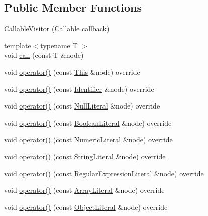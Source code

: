 \subsection*{Public Member Functions}
\begin{DoxyCompactItemize}
\item 
\hyperlink{struct_callable_visitor_af9bd3a4132494b0c91dc4f7b46e5dd0e}{Callable\+Visitor} (Callable \hyperlink{struct_callable_visitor_a52ce52c399eb34a2a16abec3361e48b8}{callback})
\item 
{\footnotesize template$<$typename T $>$ }\\void \hyperlink{struct_callable_visitor_a4ce6de39a481c39fd7eda7a317bef28a}{call} (const T \&node)
\item 
void \hyperlink{struct_callable_visitor_ac435fdf6fcab885cf21f27364883c8ad}{operator()} (const \hyperlink{struct_this}{This} \&node) override
\item 
void \hyperlink{struct_callable_visitor_a83e70f05edc12de1717db28d2cd11cd5}{operator()} (const \hyperlink{struct_identifier}{Identifier} \&node) override
\item 
void \hyperlink{struct_callable_visitor_a5bce06c30e25d3a5498bc699f6e61ecc}{operator()} (const \hyperlink{struct_null_literal}{Null\+Literal} \&node) override
\item 
void \hyperlink{struct_callable_visitor_a76ea62da5cc85a9e301f68bb61d225c7}{operator()} (const \hyperlink{struct_boolean_literal}{Boolean\+Literal} \&node) override
\item 
void \hyperlink{struct_callable_visitor_a88418c625d814fd301125a640392fead}{operator()} (const \hyperlink{struct_numeric_literal}{Numeric\+Literal} \&node) override
\item 
void \hyperlink{struct_callable_visitor_a9746653850696a2060b0c2eeff8eaa69}{operator()} (const \hyperlink{struct_string_literal}{String\+Literal} \&node) override
\item 
void \hyperlink{struct_callable_visitor_ab3c41e1fb7ac9d411e3dc7c03c936851}{operator()} (const \hyperlink{struct_regular_expression_literal}{Regular\+Expression\+Literal} \&node) override
\item 
void \hyperlink{struct_callable_visitor_a01597431529a973c356ea13809ebc001}{operator()} (const \hyperlink{struct_array_literal}{Array\+Literal} \&node) override
\item 
void \hyperlink{struct_callable_visitor_ab3e67c6bb7d8332203e686d6aac59039}{operator()} (const \hyperlink{struct_object_literal}{Object\+Literal} \&node) override
\item 

\end{DoxyCompactItemize}
